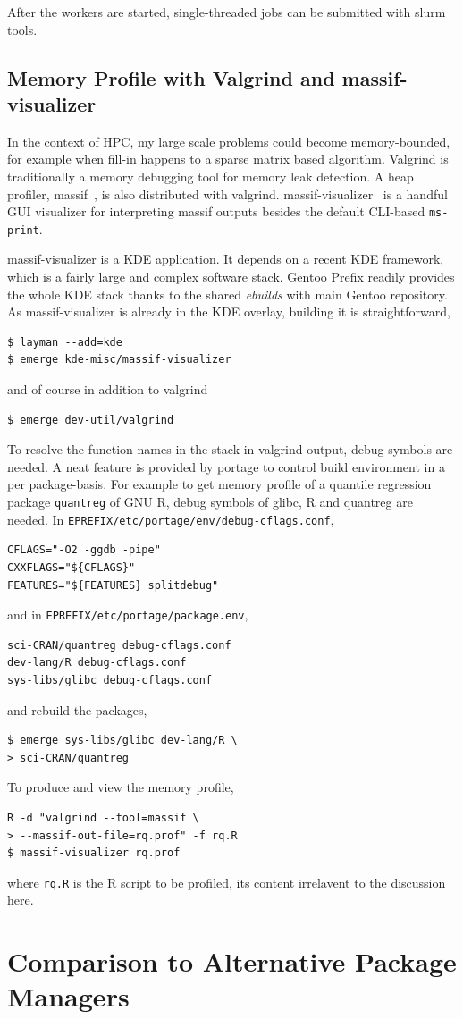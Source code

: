 \documentclass[a4paper,conference]{IEEEtran}
\begin{document}
After the workers are started, single-threaded jobs can be submitted
with slurm tools.

\subsection{Memory Profile with Valgrind and massif-visualizer}
\label{sec:massif}
In the context of HPC, my large scale problems could become
memory-bounded, for example when fill-in happens to a sparse matrix
based algorithm.  Valgrind is traditionally a memory debugging tool
for memory leak detection.  A heap profiler, massif~\cite{massif}, is
also distributed with valgrind.
massif-visualizer~\cite{massif:visualizer} is a handful GUI visualizer
for interpreting massif outputs besides the default CLI-based
\texttt{ms-print}.

massif-visualizer is a KDE application.  It depends on a recent KDE
framework, which is a fairly large and complex software stack.  Gentoo
Prefix readily provides the whole KDE stack thanks to the shared
\textit{ebuilds} with main Gentoo repository.  As massif-visualizer is
already in the KDE overlay, building it is straightforward,
\begin{verbatim}
$ layman --add=kde
$ emerge kde-misc/massif-visualizer
\end{verbatim}
and of course in addition to valgrind
\begin{verbatim}
$ emerge dev-util/valgrind
\end{verbatim}

To resolve the function names in the stack in valgrind output, debug
symbols are needed.  A neat feature is provided by portage to control
build environment in a per package-basis.  For example to get memory
profile of a quantile regression package \texttt{quantreg} of GNU R,
debug symbols of glibc, R and quantreg are needed. In
\texttt{EPREFIX/etc/portage/env/debug-cflags.conf},
\begin{verbatim}
CFLAGS="-O2 -ggdb -pipe"
CXXFLAGS="${CFLAGS}"
FEATURES="${FEATURES} splitdebug"
\end{verbatim}
and in \texttt{EPREFIX/etc/portage/package.env},
\begin{verbatim}
sci-CRAN/quantreg debug-cflags.conf
dev-lang/R debug-cflags.conf
sys-libs/glibc debug-cflags.conf
\end{verbatim}
and rebuild the packages,
\begin{verbatim}
$ emerge sys-libs/glibc dev-lang/R \
> sci-CRAN/quantreg
\end{verbatim}

To produce and view the memory profile,
\begin{verbatim}
R -d "valgrind --tool=massif \
> --massif-out-file=rq.prof" -f rq.R
$ massif-visualizer rq.prof
\end{verbatim}
where \texttt{rq.R} is the R script to be profiled, its content
irrelavent to the discussion here.

\section{Comparison to Alternative Package Managers}



\end{document}
